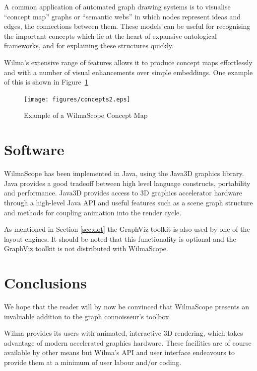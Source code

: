 \documentclass[runningheads]{cl2emult}
\begin{document}
A common application of automated graph drawing systems is to visualise
``concept map'' graphs or ``semantic webs'' in which nodes represent ideas and edges, the
connections between them.  These models can be useful for recognising
the important concepts which lie at the heart of expansive ontological
frameworks, and for explaining these structures quickly.

Wilma's extensive range of features allows it to produce concept maps
effortlessly and with a number of visual enhancements over simple
embeddings.  One example of this is shown in Figure~\ref{fig-concept}

\begin{figure}
\begin{center}
\texttt{[image: figures/concepts2.eps]} \\
\caption{Example of a WilmaScope Concept Map}
\label{fig-concept}
\end{center}
\end{figure}

\section{Software} \label{sec:software}

WilmaScope has been implemented in Java, using the Java3D graphics library.
Java provides a good tradeoff between high level language constructs,
portability and performance.  Java3D provides access to 3D graphics accelerator hardware through
a high-level Java API and useful features such as a scene graph
structure and methods for coupling animation into the render cycle.

As mentioned in Section \ref{sec:dot} the GraphViz toolkit is also
used by one of the layout engines.  It should be noted that this
functionality is optional and the GraphViz toolkit is not distributed
with WilmaScope.

\section{Conclusions} \label{sec:conclusions}

We hope that the reader will by now be convinced that WilmaScope presents an
invaluable addition to the graph connoisseur's toolbox.  

Wilma provides its users with animated, interactive 3D rendering, which takes
advantage of modern accelerated graphics hardware.  These facilities are of
course available by other means but Wilma's API and user interface
endeavours to provide them at a minimum of user labour and/or coding.
\end{document}
